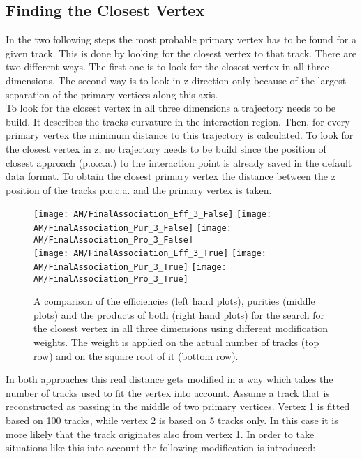 \subsection{Finding the Closest Vertex\label{sec:AMWFCV}}

In the two following steps the most probable primary vertex has to be found for a given track. This is done by looking for the closest vertex to that track. There are two different ways. The first one is to look for the closest vertex in all three dimensions. The second way is to look in z direction only because of the largest separation of the primary vertices along this axis. \\
To look for the closest vertex in all three dimensions a trajectory needs to be build. It describes the tracks curvature in the interaction region. Then, for every primary vertex the minimum distance to this trajectory is calculated. To look for the closest vertex in z, no trajectory needs to be build since the position of closest approach (p.o.c.a.) to the interaction point is already saved in the default data format. To obtain the closest primary vertex the distance between the z position of the tracks p.o.c.a. and the primary vertex is taken. \\

\begin{figure}[!ht]
    \centering
    \texttt{[image: AM/FinalAssociation\_Eff\_3\_False]}
    \texttt{[image: AM/FinalAssociation\_Pur\_3\_False]}
    \texttt{[image: AM/FinalAssociation\_Pro\_3\_False]}
    \\
    \texttt{[image: AM/FinalAssociation\_Eff\_3\_True]}
    \texttt{[image: AM/FinalAssociation\_Pur\_3\_True]}
    \texttt{[image: AM/FinalAssociation\_Pro\_3\_True]}
    \caption[Efficiencies, purities and their product using different modification weights for the search in three dimensions.]{A comparison of the efficiencies (left hand plots), purities (middle plots) and the products of both (right hand plots) for the search for the closest vertex in all three dimensions using different modification weights. The weight is applied on the actual number of tracks (top row) and on the square root of it (bottom row).\label{plot:AMWFCV3D}}
\end{figure}

In both approaches this real distance gets modified in a way which takes the number of tracks used to fit the vertex into account. Assume a track that is reconstructed as passing in the middle of two primary vertices. Vertex 1 is fitted based on 100 tracks, while vertex 2 is based on 5 tracks only. In this case it is more likely that the track originates also from vertex 1. In order to take situations like this into account the following modification is introduced:

